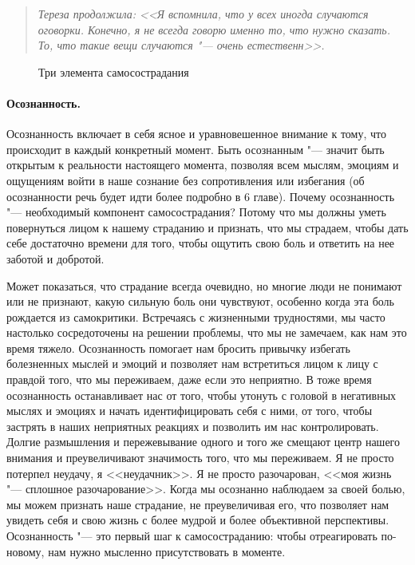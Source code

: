 \begin{quote}
	\textit{Тереза продолжила: <<Я вспомнила, что у всех иногда случаются оговорки. Конечно, я не всегда говорю именно то, что нужно сказать. То, что такие вещи случаются "--- очень естественн>>.} 
\end{quote}

\begin{figure}[h]
	\begin{center}
		
		\caption{Три элемента самосострадания}
	\end{center}
\end{figure}

\paragraph{Осознанность.} Осознанность включает в себя ясное и уравновешенное внимание к тому, что происходит в каждый конкретный момент. Быть осознанным "--- значит быть открытым к реальности настоящего момента, позволяя всем мыслям, эмоциям и ощущениям войти в наше сознание без сопротивления или избегания (об осознанности речь будет идти более подробно в 6 главе). 
Почему осознанность "--- необходимый компонент самосострадания? Потому что мы должны уметь повернуться лицом к нашему страданию и признать, что мы страдаем, чтобы дать себе достаточно времени для того, чтобы ощутить свою боль и ответить на нее заботой и добротой.
 
Может показаться, что страдание всегда очевидно, но многие люди не понимают или не признают, какую сильную боль они чувствуют, особенно когда эта боль рождается из самокритики. Встречаясь с жизненными трудностями, мы часто настолько сосредоточены на решении проблемы, что мы не замечаем, как нам  это время тяжело. Осознанность помогает нам бросить привычку избегать болезненных мыслей и эмоций и позволяет нам встретиться лицом к лицу с правдой того, что мы переживаем, даже если это неприятно. В тоже время осознанность останавливает нас от того, чтобы утонуть с головой в негативных мыслях и эмоциях и начать идентифицировать себя с ними, от того, чтобы застрять в наших неприятных реакциях и позволить им нас контролировать. Долгие размышления и пережевывание одного и того же смещают центр нашего внимания и преувеличивают значимость того, что мы переживаем. Я не просто потерпел неудачу, я <<неудачник>>. Я не просто разочарован, <<моя жизнь "--- сплошное разочарование>>. Когда мы осознанно наблюдаем за своей болью, мы можем признать наше страдание, не преувеличивая его, что позволяет нам увидеть себя и свою жизнь с более мудрой и более объективной перспективы. Осознанность "--- это первый шаг к самосостраданию: чтобы отреагировать по-новому, нам нужно мысленно присутствовать в моменте.
 
